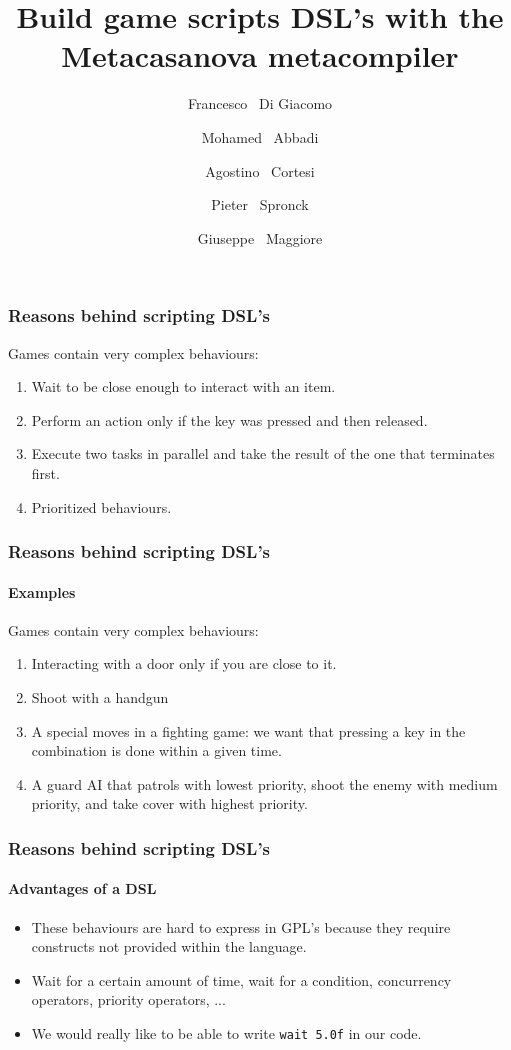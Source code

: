 \documentclass[10pt,a4paper]{beamer}
\begin{document}
\author[Di Giacomo et al.]
{Francesco ~Di Giacomo  \\
	\and Mohamed ~Abbadi  \\
	\and Agostino ~Cortesi  \\
	\and Pieter ~Spronck  \\
	\and Giuseppe ~Maggiore }
\date{}
\title{Build game scripts DSL's with the Metacasanova metacompiler}

\frame{\titlepage}

\begin{frame}
\frametitle{Reasons behind scripting DSL's}
Games contain very complex behaviours:
\begin{enumerate}
\item Wait to be close enough to interact with an item.
\item Perform an action only if the key was pressed and then released.
\item Execute two tasks in parallel and take the result of the one that terminates first.
\item Prioritized behaviours.
\end{enumerate}
\end{frame}

\begin{frame}
	\frametitle{Reasons behind scripting DSL's}
	\framesubtitle{Examples}
	Games contain very complex behaviours:
	\begin{enumerate}
		\item Interacting with a door only if you are close to it.
		\item Shoot with a handgun
		\item A special moves in a fighting game: we want that pressing a key in the combination is done within a given time.
		\item A guard AI that patrols with lowest priority, shoot the enemy with medium priority, and take cover with highest priority.
	\end{enumerate}
\end{frame}

\begin{frame}
	\frametitle{Reasons behind scripting DSL's}
	\framesubtitle{Advantages of a DSL}
	\begin{itemize}
		\item These behaviours are hard to express in GPL's because they require constructs not provided within the language.
		\item Wait for a certain amount of time, wait for a condition, concurrency operators, priority operators, ...
		\item We would really like to be able to write \texttt{wait 5.0f} in our code.
	\end{itemize}
\end{frame}
\end{document}
